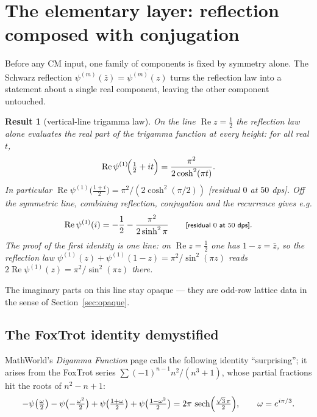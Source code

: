 \documentclass[11pt]{article}
\newtheorem{result}{Result}[section]
\theoremstyle{remark}
\newcommand{\sech}{\operatorname{sech}}
\newcommand{\dps}[1]{\textsf{\footnotesize[#1]}}
\begin{document}
\section{The elementary layer: reflection composed with conjugation}\label{sec:elementary}

Before any CM input, one family of components is fixed by symmetry alone. The Schwarz
reflection $\psi^{(m)}(\bar z)=\overline{\psi^{(m)}(z)}$ turns the reflection law into a
statement about a single real component, leaving the other component untouched.

\begin{result}[vertical-line trigamma law]\label{res:line}
On the line $\operatorname{Re}z=\tfrac12$ the reflection law alone evaluates the real part of
the trigamma function at every height: for all real $t$,
\[
\operatorname{Re}\psi^{(1)}\!\Bigl(\tfrac12+it\Bigr)=\frac{\pi^2}{2\cosh^2(\pi t)} .
\]
In particular $\operatorname{Re}\psi^{(1)}\!\bigl(\tfrac{1+i}{2}\bigr)=\pi^2/(2\cosh^2(\pi/2))$
\dps{residual $0$ at $50$ dps}. Off the symmetric line, combining reflection, conjugation and
the recurrence gives e.g.
\[
\operatorname{Re}\psi^{(1)}(i)=-\frac12-\frac{\pi^2}{2\sinh^2\pi}
\qquad\text{\dps{residual $0$ at $50$ dps}.}
\]
The proof of the first identity is one line: on $\operatorname{Re}z=\tfrac12$ one has
$1-z=\bar z$, so the reflection law
$\psi^{(1)}(z)+\psi^{(1)}(1-z)=\pi^2/\sin^2(\pi z)$ reads
$2\operatorname{Re}\psi^{(1)}(z)=\pi^2/\sin^2(\pi z)$ there.
\end{result}

The imaginary parts on this line stay opaque --- they are odd-row lattice data in the sense of
Section~\ref{sec:opaque}.

\subsection{The FoxTrot identity demystified}

MathWorld's \emph{Digamma Function} page \cite{MathWorldDigamma} calls the following
identity ``surprising''; it arises from the FoxTrot series $\sum(-1)^{n-1}n^2/(n^3+1)$,
whose partial fractions hit the roots of $n^2-n+1$:
\begin{equation}\label{eq:foxtrot}
-\psi\bigl(\tfrac{\omega}{2}\bigr)-\psi\bigl(-\tfrac{\omega^2}{2}\bigr)
+\psi\bigl(\tfrac{1+\omega}{2}\bigr)+\psi\bigl(\tfrac{1-\omega^2}{2}\bigr)
=2\pi\,\sech\Bigl(\tfrac{\sqrt3\,\pi}{2}\Bigr),\qquad \omega=e^{i\pi/3}.
\end{equation}
\end{document}
